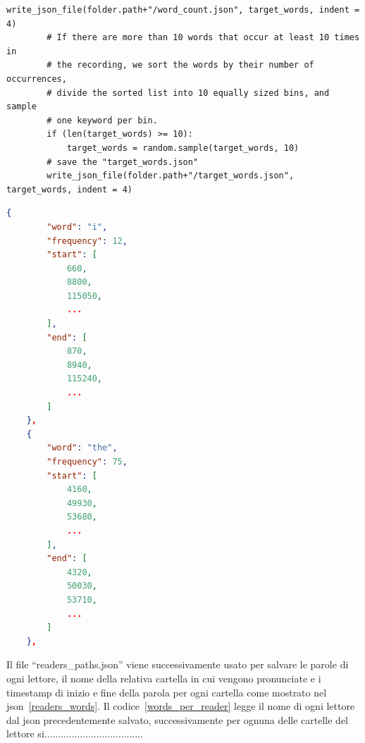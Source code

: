 \documentclass[12pt,a4paper,titlepage]{article}
\begin{document}
\begin{lstlisting}[language=iPython,firstnumber=1, caption=find\_target\_words.py, label=find_target_words,captionpos=b]
        write_json_file(folder.path+"/word_count.json", target_words, indent = 4)
        # If there are more than 10 words that occur at least 10 times in
        # the recording, we sort the words by their number of occurrences,
        # divide the sorted list into 10 equally sized bins, and sample 
        # one keyword per bin.
        if (len(target_words) >= 10):
            target_words = random.sample(target_words, 10)
        # save the "target_words.json"
        write_json_file(folder.path+"/target_words.json", target_words, indent = 4)

\end{lstlisting}

\begin{lstlisting}[language=json,firstnumber=1, caption=Formato del file word\_count.json, label=word_count,captionpos=b]
{
        "word": "i",
        "frequency": 12,
        "start": [
            660,
            8800,
            115050,
            ...
        ],
        "end": [
            870,
            8940,
            115240,
            ...
        ]
    },
    {
        "word": "the",
        "frequency": 75,
        "start": [
            4160,
            49930,
            53680,
            ...
        ],
        "end": [
            4320,
            50030,
            53710,
			...
   		]                
    },
\end{lstlisting}
            
Il file ``readers\_paths.json'' viene successivamente usato per salvare le parole di ogni lettore, il nome della relativa cartella in cui vengono pronunciate e i timestamp di inizio e fine della parola per ogni cartella come mostrato nel json~\ref{readers_words}. Il codice~\ref{words_per_reader} legge il nome di ogni lettore dal json precedentemente salvato, successivamente per ognuna delle cartelle del lettore si....................................
\end{document}
